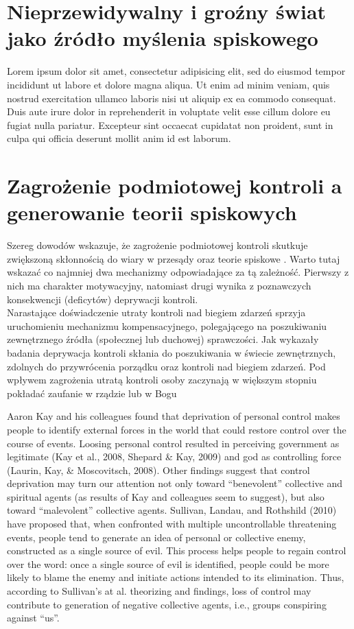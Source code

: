 \documentclass[man]{apa6}
\begin{document}
    \section{Nieprzewidywalny i groźny świat jako źródło myślenia spiskowego}

    Lorem ipsum dolor sit amet, consectetur adipisicing elit, sed do eiusmod tempor incididunt ut labore et dolore magna aliqua. Ut enim ad minim veniam, quis nostrud exercitation ullamco laboris nisi ut aliquip ex ea commodo consequat. Duis aute irure dolor in reprehenderit in voluptate velit esse cillum dolore eu fugiat nulla pariatur. Excepteur sint occaecat cupidatat non proident, sunt in culpa qui officia deserunt mollit anim id est laborum.

    \section{Zagrożenie podmiotowej kontroli a generowanie teorii spiskowych}

    Szereg dowodów wskazuje, że zagrożenie podmiotowej kontroli skutkuje zwiększoną skłonnością do wiary w przesądy oraz teorie spiskowe \parencite{whitson2008lacking}. Warto tutaj wskazać co najmniej dwa mechanizmy odpowiadające za tą zależność. Pierwszy z nich ma charakter motywacyjny, natomiast drugi wynika z poznawczych konsekwencji (deficytów) deprywacji kontroli.\\

    Narastające doświadczenie utraty kontroli nad biegiem zdarzeń sprzyja uruchomieniu mechanizmu kompensacyjnego, polegającego na poszukiwaniu zewnętrznego źródła (społecznej lub duchowej) sprawczości. Jak wykazały badania \textcite{kay2008god} deprywacja kontroli skłania do poszukiwania w świecie zewnętrznych, zdolnych do przywrócenia porządku oraz kontroli nad biegiem zdarzeń. Pod wpływem zagrożenia utratą kontroli osoby zaczynają w większym stopniu pokładać zaufanie w rządzie lub w Bogu 

 Aaron Kay and his colleagues found that deprivation of personal control makes people to identify external forces in the world that could restore control over the course of events. Loosing personal control resulted in perceiving government as legitimate (Kay et al., 2008, Shepard & Kay, 2009) and god as controlling force (Laurin, Kay, & Moscovitsch, 2008). Other findings suggest that control deprivation may turn our attention not only toward “benevolent” collective and spiritual agents (as results of Kay and colleagues seem to suggest), but also toward ``malevolent'' collective agents. Sullivan, Landau, and Rothshild  (2010) have proposed that, when confronted with multiple uncontrollable threatening events, people tend to generate an idea of personal or collective enemy, constructed as a single source of evil. This process helps people to regain control over the word: once a single source of evil is identified, people could be more likely to blame the enemy and initiate actions intended to its elimination. Thus, according to Sullivan’s at al. theorizing and findings, loss of control may contribute to generation of negative collective agents, i.e., groups conspiring against ``us''.
\end{document}
